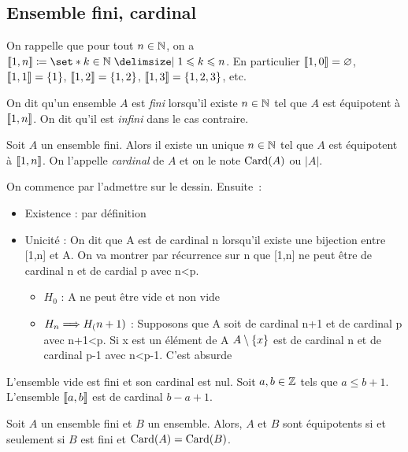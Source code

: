 \documentclass{magnolia}
\begin{document}
\subsection{Ensemble fini, cardinal}

On rappelle que pour tout $n\in\mathbb{N}$, on a $\intere{1}{n}\defeq\enstq{k\in\N}{1\leq k\leq n}$.
En particulier $\left\llbracket 1,0\right\rrbracket=\varnothing$, $\left\llbracket 1,1\right\rrbracket=\left\{1\right\}$,
$\left\llbracket 1,2\right\rrbracket=\left\{1, 2\right\}$, $\left\llbracket 1,3\right\rrbracket=\left\{1, 2, 3\right\}$, etc. 
\vspace{2ex}
\begin{definition}
On dit qu'un ensemble $A$ est \emph{fini} lorsqu'il existe $n\in\mathbb{N}$ tel que $A$ est
équipotent à $\left\llbracket 1,n\right\rrbracket$. On dit qu'il est \emph{infini} dans le cas contraire.
\end{definition}

\begin{definition}
Soit $A$ un ensemble fini. Alors il existe un unique $n\in\mathbb{N}$ tel que $A$ est
équipotent à $\left\llbracket 1,n\right\rrbracket$. On l'appelle \emph{cardinal} de $A$ et on le note
$\operatorname{Card}(A)$ ou $|A|$.
\end{definition}

\begin{preuve}
On commence par l'admettre sur le dessin. Ensuite~:
\begin{itemize}
\item Existence : par définition
\item Unicité : On dit que A est de cardinal n lorsqu'il existe une bijection
  entre [1,n] et A.
  On va montrer par récurrence sur n que [1,n] ne peut être de
  cardinal n et de cardial p avec n<p.
  \begin{itemize}
  \item $H_0$ : A ne peut être vide et non vide
  \item $H_n \Longrightarrow H_(n+1)$ : Supposons que A soit de cardinal n+1 et de
     cardinal p avec
     n+1<p. Si x est un élément de A $A\setminus\left\{x\right\}$ est de cardinal n et de
     cardinal p-1 avec n<p-1. C'est absurde
  \end{itemize}
\end{itemize}
\end{preuve}

\begin{remarques}
  \remarque L'ensemble vide est fini et son cardinal est nul.
  \remarque Soit $a,b\in\mathbb{Z}$ tels que $a\leq b + 1$. L'ensemble $\left\llbracket a,b\right\rrbracket$ est de
  cardinal $b-a+1$.
\end{remarques}

\begin{proposition}
Soit $A$ un ensemble fini et $B$ un ensemble. Alors, $A$ et $B$ sont équipotents si et
seulement si $B$ est fini et $\operatorname{Card}(A)=\operatorname{Card}(B)$.  
\end{proposition}
\end{document}
